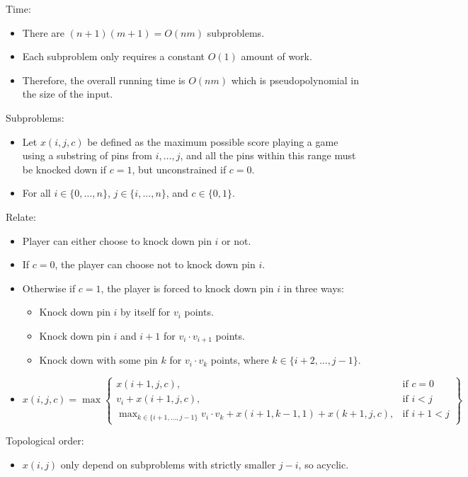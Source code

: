 \documentclass[12pt,twoside]{article}
\begin{document}
\begin{problems}
Time:
\begin{itemize}
    \item There are $(n+1)(m+1)=O(nm)$ subproblems.
    \item Each subproblem only requires a constant $O(1)$ amount of work.
    \item Therefore, the overall running time is $O(nm)$ which is pseudopolynomial in the size of the input.
\end{itemize}

\newpage
\problem  %

Subproblems:
\begin{itemize}
    \item Let $x(i,j,c)$ be defined as the maximum possible score playing a game using a substring of pins from $i,\ldots,j$, and all the pins within this range must be knocked down if $c=1$, but unconstrained if $c=0$.
    \item For all $i \in \{0,\ldots,n\}$, $j \in \{i,\ldots,n\}$, and $c \in \{0,1\}$.
\end{itemize}

Relate:
\begin{itemize}
    \item Player can either choose to knock down pin $i$ or not.
    \item If $c=0$, the player can choose not to knock down pin $i$.
    \item Otherwise if $c=1$, the player is forced to knock down pin $i$ in three ways:
        \begin{itemize}
            \item Knock down pin $i$ by itself for $v_i$ points.
            \item Knock down pin $i$ and $i+1$ for $v_i \cdot v_{i+1}$ points.
            \item Knock down with some pin $k$ for $v_i \cdot v_k$ points, where $k \in \{i+2,\ldots,j-1\}$.
        \end{itemize}
    \item $x(i,j,c)=\max\left\{\begin{array}{lr}
        x(i+1,j,c), & \text{if } c=0 \\
        v_i+x(i+1,j,c), & \text{if } i<j \\
        \max_{k\in\{i+1,\ldots,j-1\}} v_i \cdot v_k+x(i+1,k-1,1)+x(k+1,j,c), & \text{if } i+1<j
    \end{array}\right\}$
\end{itemize}

Topological order:
\begin{itemize}
    \item $x(i,j)$ only depend on subproblems with strictly smaller $j-i$, so acyclic.
\end{itemize}


\end{problems}
\end{document}
